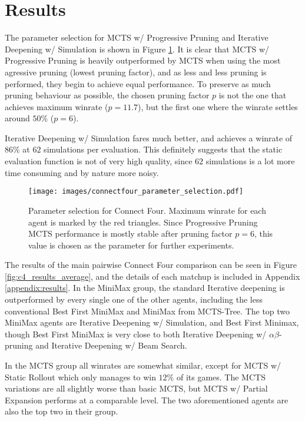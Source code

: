 \section{Results}

The parameter selection for MCTS w/ Progressive Pruning and Iterative Deepening w/ Simulation is shown in Figure \ref{fig:parameter_selection}. It is clear that MCTS w/ Progressive Pruning is heavily outperformed by MCTS when using the most agressive pruning (lowest pruning factor), and as less and less pruning is performed, they begin to achieve equal performance. To preserve as much pruning behaviour as possible, the chosen pruning factor $p$ is not the one that achieves maximum winrate ($p=11.7$), but the first one where the winrate settles around $50\%$ ($p=6$).

Iterative Deepening w/ Simulation fares much better, and achieves a winrate of $86\%$ at $62$ simulations per evaluation. This definitely suggests that the static evaluation function is not of very high quality, since $62$ simulations is a lot more time consuming and by nature more noisy.

\begin{figure}[H]
    \centering
    \texttt{[image: images/connectfour\_parameter\_selection.pdf]}
    \caption{Parameter selection for Connect Four. Maximum winrate for each
    agent is marked by the red triangles. Since Progressive Pruning MCTS 
    performance is mostly stable after pruning factor $p=6$, this value
    is chosen as the parameter for further experiments.}
    \label{fig:parameter_selection}
\end{figure}

The results of the main pairwise Connect Four comparison can be seen in Figure \ref{fig:c4_results_average}, and the details of each matchup is included in Appendix \ref{appendix:results}. In the MiniMax group, the standard Iterative deepening is outperformed by every single one of the other agents, including the less conventional Best First MiniMax and MiniMax from MCTS-Tree. The top two MiniMax agents are Iterative Deepening w/ Simulation, and Best First Minimax, though Best First MiniMax is very close to both Iterative Deepening w/ $\alpha\beta$-pruning and Iterative Deepening w/ Beam Search. 

In the MCTS group all winrates are somewhat similar, except for MCTS w/ Static Rollout which only manages to win $12\%$ of its games. The MCTS variations are all slightly worse than basic MCTS, but MCTS w/ Partial Expansion performs at a comparable level. The two aforementioned agents are also the top two in their group. 

